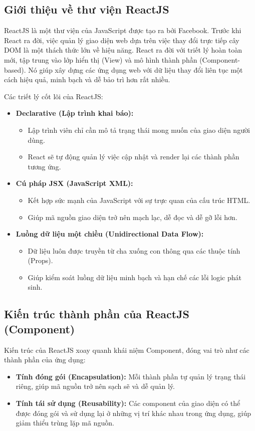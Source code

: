 \documentclass[../main.tex]{subfiles}
\begin{document}
\subsection{Giới thiệu về thư viện ReactJS}

ReactJS là một thư viện của JavaScript được tạo ra bởi Facebook. Trước khi React ra đời, việc quản lý giao diện web dựa trên việc thay đổi trực tiếp cây DOM là một thách thức lớn về hiệu năng. React ra đời với triết lý hoàn toàn mới, tập trung vào lớp hiển thị (View) và mô hình thành phần (Component-based). Nó giúp xây dựng các ứng dụng web với dữ liệu thay đổi liên tục một cách hiệu quả, minh bạch và dễ bảo trì hơn rất nhiều.

Các triết lý cốt lõi của ReactJS:
\begin{itemize}
    \item \textbf{Declarative (Lập trình khai báo):}
    \begin{itemize}
        \item Lập trình viên chỉ cần mô tả trạng thái mong muốn của giao diện người dùng.
        \item React sẽ tự động quản lý việc cập nhật và render lại các thành phần tương ứng.
    \end{itemize}
    \item \textbf{Cú pháp JSX (JavaScript XML):}
    \begin{itemize}
        \item Kết hợp sức mạnh của JavaScript với sự trực quan của cấu trúc HTML.
        \item Giúp mã nguồn giao diện trở nên mạch lạc, dễ đọc và dễ gỡ lỗi hơn.
    \end{itemize}
    \item \textbf{Luồng dữ liệu một chiều (Unidirectional Data Flow):}
    \begin{itemize}
        \item Dữ liệu luôn được truyền từ cha xuống con thông qua các thuộc tính (Props).
        \item Giúp kiểm soát luồng dữ liệu minh bạch và hạn chế các lỗi logic phát sinh.
    \end{itemize}
\end{itemize}

\subsection{Kiến trúc thành phần của ReactJS (Component)}

Kiến trúc của ReactJS xoay quanh khái niệm Component, đóng vai trò như các thành phần của ứng dụng:
\begin{itemize}
    \item \textbf{Tính đóng gói (Encapsulation):} Mỗi thành phần tự quản lý trạng thái riêng, giúp mã nguồn trở nên sạch sẽ và dễ quản lý.
    \item \textbf{Tính tái sử dụng (Reusability):} Các component của giao diện có thể được đóng gói và sử dụng lại ở những vị trí khác nhau trong ứng dụng, giúp giảm thiểu trùng lặp mã nguồn.
\end{itemize}
\end{document}
